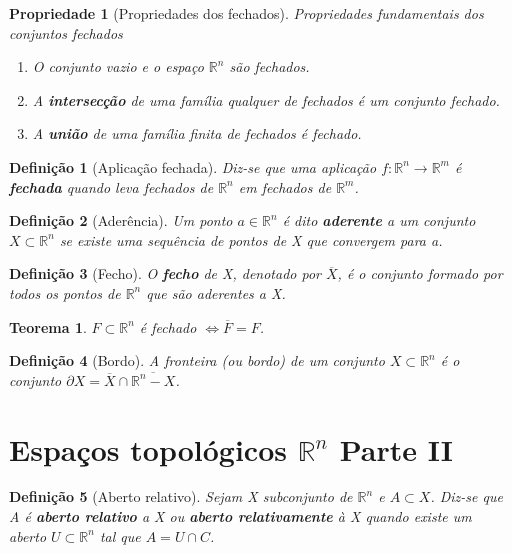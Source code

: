 \documentclass{article}
\newtheorem{prop}{Propriedade}
\newtheorem{theorem}{Teorema}
\newtheorem{definition}{Definição}
\begin{document}
\begin{prop}[Propriedades dos fechados]
Propriedades fundamentais dos conjuntos fechados

\begin{enumerate}
    \item O conjunto vazio e o espaço $\mathbb{R}^n$ são fechados.
    
    \item A \textbf{intersecção} de uma família qualquer de fechados é um conjunto fechado.
    
    \item A \textbf{união} de uma família finita de fechados é fechado.
\end{enumerate}
\end{prop}

\begin{definition}[Aplicação fechada]
Diz-se que uma aplicação $f: \mathbb{R}^n \rightarrow \mathbb{R}^m$ é \textbf{fechada} quando leva fechados de $\mathbb{R}^n$ em fechados de $\mathbb{R}^m$.
\end{definition}

\begin{definition}[Aderência]
Um ponto $a \in \mathbb{R}^n$ é dito \textbf{aderente} a um conjunto $X \subset \mathbb{R}^n$ se existe uma sequência de pontos de X que convergem para a.
\end{definition}

\begin{definition}[Fecho]
O \textbf{fecho} de X, denotado por $\overline{X}$, é o conjunto formado por todos os pontos de $\mathbb{R}^n$ que são aderentes a X.
\end{definition}

\begin{theorem}
$F \subset \mathbb{R}^n$ é fechado $\Longleftrightarrow \overline{F} = F$.
\end{theorem}

\begin{definition}[Bordo]
A fronteira (ou bordo) de um conjunto $X \subset \mathbb{R}^n$ é o conjunto $\partial X = \overline{X} \cap \overline{\mathbb{R}^n - X}$.
\end{definition}

\section*{Espaços topológicos $\mathbb{R}^n$ Parte II}
\label{s10}
\begin{definition}[Aberto relativo]
Sejam X subconjunto de $\mathbb{R}^n$ e $A \subset X$. Diz-se que A é \textbf{aberto relativo} a X ou \textbf{aberto relativamente} à X quando existe um aberto $U \subset \mathbb{R}^n$ tal que $A = U \cap C$.
\end{definition}
\end{document}
